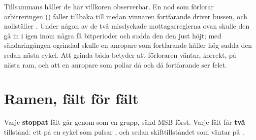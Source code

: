 Tillsammans håller de här villkoren  observerbar. En nod som förlorar arbitreringen
() faller tillbaka till  medan vinnaren fortfarande driver bussen,
och  nollställer . Under någon av de två misslyckade mottagarreglerna
ovan skulle den gå in i  igen inom några få bitperioder och sudda den 
den just höjt; med sändaringången ogrindad skulle en anropare som fortfarande håller 
hög sudda den redan nästa cykel. Att grinda båda betyder att förloraren väntar, korrekt, på nästa
ram, och att en anropare som pollar  då och då fortfarande ser felet.

\section{Ramen, fält för fält}
\label{c16:sec:fields}


Varje \textbf{stoppat} fält går genom  som en grupp, sänd MSB först. Varje fält
får \textbf{två} tillstånd: ett  på en cykel som pulsar ,
och sedan skifttillståndet som väntar på .

